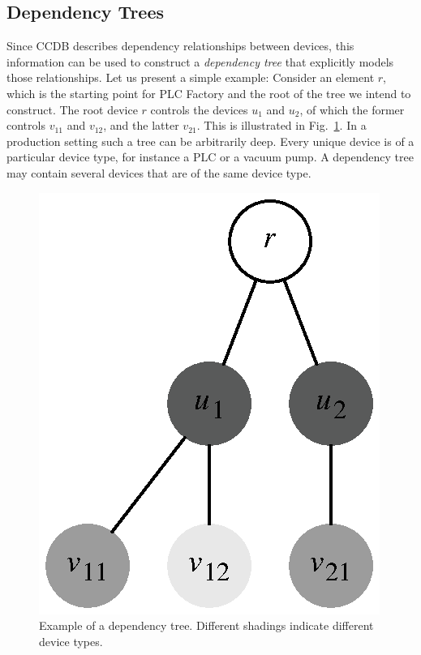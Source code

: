 \documentclass[a4paper,
              ]{jacow}
\begin{document}
\subsection{Dependency Trees}
Since CCDB describes dependency relationships between devices, this information can be used to construct a \emph{dependency tree} that explicitly models those relationships. Let us present a simple example: Consider an element $r$, which is the starting point for PLC Factory and the root of the tree we intend to construct. The root device $r$ controls the devices $u_1$ and $u_2$, of which the former controls $v_{11}$ and $v_{12}$, and the latter $v_{21}$. This is illustrated in Fig.\ \ref{fig:deviceTree}. In a production setting such a tree can be arbitrarily deep. Every unique device is of a particular device type, for instance a PLC or a vacuum pump. A dependency tree may contain several devices that are of the same device type.

\begin{figure}[h]
\centering
  \includegraphics[scale=0.8]{TUPHA046.eps}
  \caption{Example of a dependency tree. Different shadings indicate different device types.}
  \label{fig:deviceTree}
\end{figure}

\end{document}

